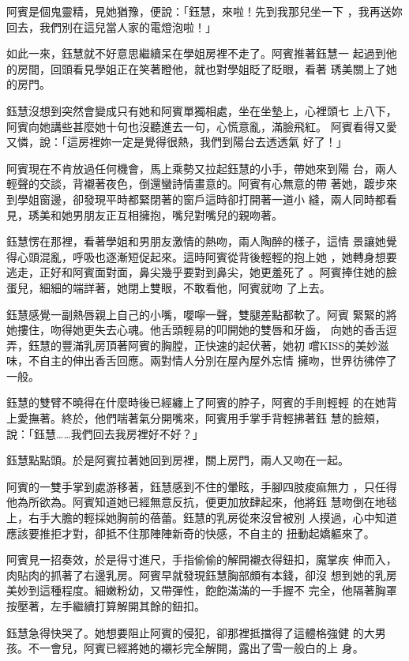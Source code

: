 阿賓是個鬼靈精，見她猶豫，便說：「鈺慧，來啦！先到我那兒坐一下
，我再送妳回去，我們別在這兒當人家的電燈泡啦！」

如此一來，鈺慧就不好意思繼續呆在學姐房裡不走了。阿賓推著鈺慧一
起過到他的房間，回頭看見學姐正在笑著瞪他，就也對學姐眨了眨眼，看著
琇美關上了她的房門。

鈺慧沒想到突然會變成只有她和阿賓單獨相處，坐在坐墊上，心裡頭七
上八下，阿賓向她講些甚麼她十句也沒聽進去一句，心慌意亂，滿臉飛紅。
阿賓看得又愛又憐，說：「這房裡妳一定是覺得很熱，我們到陽台去透透氣
好了！」

阿賓現在不肯放過任何機會，馬上乘勢又拉起鈺慧的小手，帶她來到陽
台，兩人輕聲的交談，背襯著夜色，倒還蠻詩情畫意的。阿賓有心無意的帶
著她，踱步來到學姐窗邊，卻發現平時都緊閉著的窗戶這時卻打開著一道小
縫，兩人同時都看見，琇美和她男朋友正互相擁抱，嘴兒對嘴兒的親吻著。

鈺慧愣在那裡，看著學姐和男朋友激情的熱吻，兩人陶醉的樣子，這情
景讓她覺得心頭混亂，呼吸也逐漸短促起來。這時阿賓從背後輕輕的抱上她
，她轉身想要逃走，正好和阿賓面對面，鼻尖幾乎要對到鼻尖，她更羞死了
。阿賓捧住她的臉蛋兒，細細的端詳著，她閉上雙眼，不敢看他，阿賓就吻
了上去。

鈺慧感覺一副熱唇親上自己的小嘴，嚶嚀一聲，雙腿差點都軟了。阿賓
緊緊的將她摟住，吻得她更失去心魂。他舌頭輕易的叩開她的雙唇和牙齒，
向她的香舌逗弄，鈺慧的豐滿乳房頂著阿賓的胸膛，正快速的起伏著，她初
嚐KISS的美妙滋味，不自主的伸出香舌回應。兩對情人分別在屋內屋外忘情
擁吻，世界彷彿停了一般。

鈺慧的雙臂不曉得在什麼時後已經纏上了阿賓的脖子，阿賓的手則輕輕
的在她背上愛撫著。終於，他們喘著氣分開嘴來，阿賓用手掌手背輕拂著鈺
慧的臉頰，說：「鈺慧……我們回去我房裡好不好？」

鈺慧點點頭。於是阿賓拉著她回到房裡，關上房門，兩人又吻在一起。

阿賓的一雙手掌到處游移著，鈺慧感到不住的暈眩，手腳四肢痠痲無力
，只任得他為所欲為。阿賓知道她已經無意反抗，便更加放肆起來，他將鈺
慧吻倒在地毯上，右手大膽的輕採她胸前的蓓蕾。鈺慧的乳房從來沒曾被別
人摸過，心中知道應該要推拒才對，卻抵不住那陣陣新奇的快感，不自主的
扭動起嬌軀來了。

阿賓見一招奏效，於是得寸進尺，手指偷偷的解開襯衣得鈕扣，魔掌疾
伸而入，肉貼肉的抓著了右邊乳房。阿賓早就發現鈺慧胸部頗有本錢，卻沒
想到她的乳房美妙到這種程度。細嫩粉幼，又帶彈性，飽飽滿滿的一手握不
完全，他隔著胸罩按壓著，左手繼續打算解開其餘的鈕扣。

鈺慧急得快哭了。她想要阻止阿賓的侵犯，卻那裡抵擋得了這體格強健
的大男孩。不一會兒，阿賓已經將她的襯衫完全解開，露出了雪一般白的上
身。

